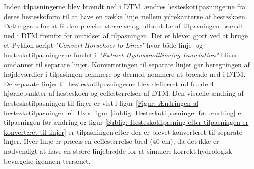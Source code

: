 Inden tilpasningerne blev brændt ned i DTM, ændres hesteskotilpasningerne fra deres hesteskoform til at have en række linje mellem ydrekanterne af hesteskoen. Dette gøres for at få den præcise størrelse og udbredelse af tilpasningen brændt ned i DTM fremfor for omridset af tilpasningen. Det er blevet gjort ved at bruge et Python-script \textit{"Convert Horsehoes to Lines"} hvor både linje- og hesteskotilpasningerne fundet i \textit{"Extract Hydroconditioning Inundation"} bliver omdannet til separate linjer. Konverteringen til separate linjer gør beregningen af højdeværdier i tilpasingen nemmere og dermed nemmere at brænde ned i DTM.\\
De separate linjer til hesteskotilpasningerne blev defineret ud fra de 4 hjørnepunkter af hesteskoen og cellestørrelsen af DTM. Den visuelle ændring af hesteskotilpasningen til linjer er vist i figur \ref{Figur: Ændringen af hesteskotilpasningerne}. Hvor figur \ref{Subfig: Hesteskotilpasninger før ændring} er tilpasningen før ændring og figur \ref{Subfig: Hesteskotilpasning efter tilpasningen er konverteret til linjer} er tilpasningen efter den er blevet konverteret til separate linjer. Hver linje er præcis en cellestørrelse bred (40 cm), da det ikke er nødvendigt at have en større linjebredde for at simulere korrekt hydrologisk bevægelse igennem terrænet. 

